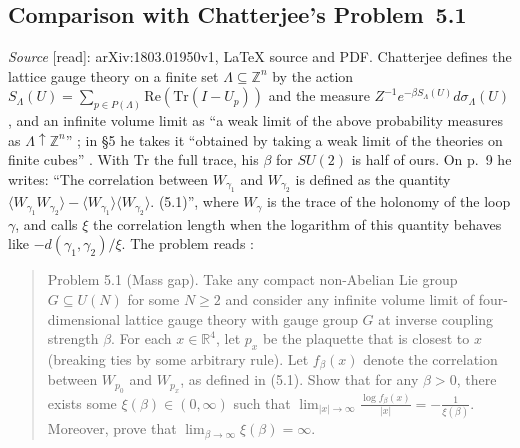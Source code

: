 \documentclass[11pt,a4paper]{article}
\theoremstyle{plain}
\theoremstyle{definition}
\theoremstyle{remark}
\numberwithin{equation}{section}
\newcommand{\R}{\mathbb{R}}
\newcommand{\Z}{\mathbb{Z}}
\newcommand{\st}[1]{\textsf{[#1]}}
\begin{document}
\subsection{Comparison with Chatterjee's Problem~5.1}\label{sec:cha}
\emph{Source} \st{read}: arXiv:1803.01950v1, LaTeX source and PDF. Chatterjee defines the lattice gauge theory on a finite set
$\Lambda\subseteq\Z^n$ by the action $S_\Lambda(U)=\sum_{p\in P(\Lambda)}\mathrm{Re}(\mathrm{Tr}(I-U_p))$ and the measure
$Z^{-1}e^{-\beta S_\Lambda(U)}d\sigma_\Lambda(U)$, and an infinite volume limit as ``a weak limit of the above probability measures as
$\Lambda\uparrow\Z^n$'' \cite[\S3, p.~4]{Cha18}; in \S5 he takes it ``obtained by taking a weak limit of the theories on finite cubes''
\cite[p.~9]{Cha18}. With $\mathrm{Tr}$ the full trace, his $\beta$ for $SU(2)$ is half of ours. On p.~9 he writes: ``The correlation between
$W_{\gamma_1}$ and $W_{\gamma_2}$ is defined as the quantity $\langle W_{\gamma_1}W_{\gamma_2}\rangle-\langle W_{\gamma_1}\rangle\langle
W_{\gamma_2}\rangle$. (5.1)'', where $W_\gamma$ is the trace of the holonomy of the loop $\gamma$, and calls $\xi$ the correlation length when
the logarithm of this quantity behaves like $-d(\gamma_1,\gamma_2)/\xi$. The problem reads \cite[p.~9]{Cha18}:
\begin{quote}\small
Problem 5.1 (Mass gap). Take any compact non-Abelian Lie group $G\subseteq U(N)$ for some $N\ge2$ and consider any infinite volume
limit of four-dimensional lattice gauge theory with gauge group $G$ at inverse coupling strength $\beta$. For each $x\in\R^4$, let $p_x$
be the plaquette that is closest to $x$ (breaking ties by some arbitrary rule). Let $f_\beta(x)$ denote the correlation between $W_{p_0}$
and $W_{p_x}$, as defined in (5.1). Show that for any $\beta>0$, there exists some $\xi(\beta)\in(0,\infty)$ such that
$\lim_{|x|\to\infty}\frac{\log f_\beta(x)}{|x|}=-\frac1{\xi(\beta)}$. Moreover, prove that $\lim_{\beta\to\infty}\xi(\beta)=\infty$.
\end{quote}
\end{document}
